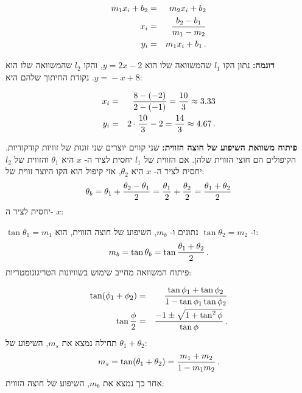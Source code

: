 \begin{eqnarray*}
m_1x_i+b_2&=&m_2x_i+b_2\\
x_i &=& \displaystyle\frac{b_2-b_1}{m_1-m_2}\\
y_i &=&m_1x_i+b_1\,.
\end{eqnarray*}



\textbf{דוגמה:}
נתון הקו
$l_1$
שהמשוואה שלו הוא
$y\!=\!2x-2$,
והקו
$l_2$
שהמשוואה שלו הוא
$y\!=\!-x+8$.
נקודת החיתוך שלהם היא:

\begin{eqnarray*}
x_i&=&\displaystyle\frac{8-(-2)}{2-(-1)}=\displaystyle\frac{10}{3}\approx 3.33\\
y_i &=& 2\cdot\displaystyle\frac{10}{3}-2=\displaystyle\frac{14}{3}\approx 4.67\,.
\end{eqnarray*}

\textbf{פיתוח משוואת השיפוע של חוצה הזווית:}
שני קווים יוצרים שני זוגות של זוויות קודקודיות. הקיפולים הם חוצי הזווית שלהן.
אם הזווית של
$l_1$
יחסית לציר ה-%
$x$
היא
$\theta_1$ 
והזווית של 
$l_2$
יחסית לציר ה-%
$x$
היא
$\theta_2$,
אזי קיפול הוא הקו היוצר זווית של:
\[
\theta_b=
\theta_1+\displaystyle\frac{\theta_2-\theta_1}{2}=
\displaystyle\frac{\theta_1}{2}+\displaystyle\frac{\theta_2}{2}=
\displaystyle\frac{\theta_1+\theta_2}{2}
\]
יחסית לציר ה-%
$x$:

\begin{center}

\end{center}
$\tan\theta_1=m_1$
ו-%
$\tan\theta_2=m_2$
נתונים ו-%
$m_b$,
השיפוע של חוצה הזווית, הוא:
\[
m_b=\tan\theta_b=\tan\displaystyle\frac{\theta_1+\theta_2}{2}\,.
\]
פיתוח המשוואה מחייב שימוש בשוויונות הטריגונומטריות:

\begin{eqnarray*}
\tan(\phi_1+\phi_2)&=& \displaystyle\frac{\tan\phi_1+\tan\phi_2}{1-\tan\phi_1\tan\phi_2}\\
\tan \displaystyle\frac{\phi}{2}&=& \displaystyle\frac{-1\pm\sqrt{1+\tan^2\phi}}{\tan \phi}\,.
\end{eqnarray*}
תחילה נמצא את
$m_s$,
השיפוע של
$\theta_1+\theta_2$:
\[
m_s=\tan(\theta_1+\theta_2)= \displaystyle\frac{m_1+m_2}{1-m_1m_2}\,.
\]
אחר כך נמצא את 
$m_b$,
השיפוע של חוצה הזווית:

